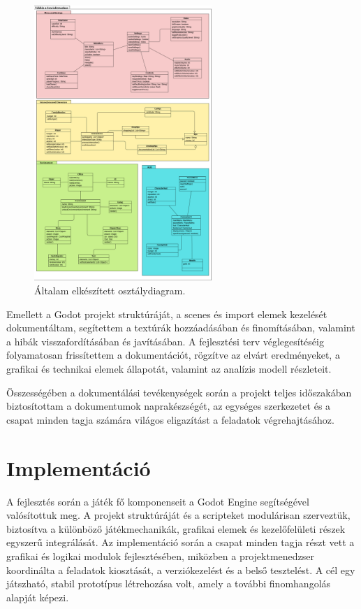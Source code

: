 \documentclass[12pt,a4paper]{article}
\begin{document}
\begin{figure}[h]
    \centering
    \includegraphics[width=0.6\textwidth]{latex/images/classdiagram.png}
    \caption{Általam elkészített osztálydiagram.}
    \label{fig:classdia}
\end{figure}

Emellett a Godot projekt struktúráját, a scenes és import elemek kezelését dokumentáltam, segítettem a textúrák hozzáadásában és finomításában, valamint a hibák visszafordításában és javításában. A fejlesztési terv véglegesítéséig folyamatosan frissítettem a dokumentációt, rögzítve az elvárt eredményeket, a grafikai és technikai elemek állapotát, valamint az analízis modell részleteit.

Összességében a dokumentálási tevékenységek során a projekt teljes időszakában biztosítottam a dokumentumok naprakészségét, az egységes szerkezetet és a csapat minden tagja számára világos eligazítást a feladatok végrehajtásához.

\section{Implementáció}

A fejlesztés során a játék fő komponenseit a Godot Engine segítségével valósítottuk meg. 
A projekt struktúráját és a scripteket modulárisan szerveztük, biztosítva a különböző játékmechanikák, 
grafikai elemek és kezelőfelületi részek egyszerű integrálását. Az implementáció során 
a csapat minden tagja részt vett a grafikai és logikai modulok fejlesztésében, 
miközben a projektmenedzser koordinálta a feladatok kiosztását, a verziókezelést és a belső tesztelést. 
A cél egy játszható, stabil prototípus létrehozása volt, amely a további finomhangolás alapját képezi.
\end{document}
